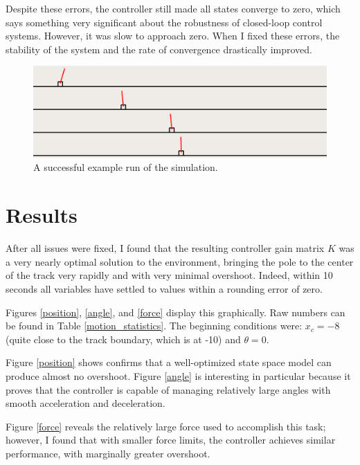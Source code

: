 \documentclass[11pt]{article}
\begin{document}
Despite these errors, the controller still made all states converge to zero, which says something very significant about the robustness of closed-loop control systems. However, it was slow to approach zero. When I fixed these errors, the stability of the system and the rate of convergence drastically improved.

\begin{figure}[ht]
    \centering
    \includegraphics[width=\textwidth]{animation}
    \caption{\label{animation} A successful example run of the simulation.}
\end{figure}

\section{Results}

After all issues were fixed, I found that the resulting controller gain matrix $K$ was a very nearly optimal solution to the environment, bringing the pole to the center of the track very rapidly and with very minimal overshoot. Indeed, within 10 seconds all variables have settled to values within a rounding error of zero.

Figures \ref{position}, \ref{angle}, and \ref{force} display this graphically. Raw numbers can be found in Table \ref{motion_statistics}. The beginning conditions were: $x _c = -8$ (quite close to the track boundary, which is at -10) and $\theta = 0$.

Figure \ref{position} shows confirms that a well-optimized state space model can produce almost no overshoot. Figure \ref{angle} is interesting in particular because it proves that the controller is capable of managing relatively large angles with smooth acceleration and deceleration.

Figure \ref{force} reveals the relatively large force used to accomplish this task; however, I found that with smaller force limits, the controller achieves similar performance, with marginally greater overshoot.
\end{document}
